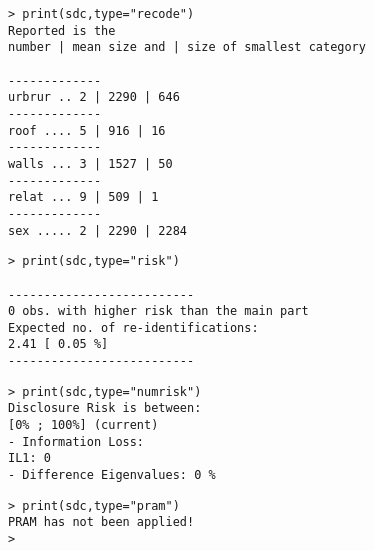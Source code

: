 \documentclass[SDCmaster.tex]{subfiles}
\begin{document}
\begin{frame}[fragile]
	\begin{verbatim}
> print(sdc,type="recode")
Reported is the
number | mean size and | size of smallest category

-------------
urbrur .. 2 | 2290 | 646 
-------------
roof .... 5 | 916 | 16 
-------------
walls ... 3 | 1527 | 50 
-------------
relat ... 9 | 509 | 1 
-------------
sex ..... 2 | 2290 | 2284 
\end{verbatim}
\end{frame}
\begin{frame}[fragile]
	\begin{verbatim}
> print(sdc,type="risk")

--------------------------
0 obs. with higher risk than the main part
Expected no. of re-identifications:
2.41 [ 0.05 %]
--------------------------

\end{verbatim}
\end{frame}
\begin{frame}[fragile]
	\begin{verbatim}
> print(sdc,type="numrisk")
Disclosure Risk is between: 
[0% ; 100%] (current)
- Information Loss:
IL1: 0
- Difference Eigenvalues: 0 %
\end{verbatim}
\end{frame}
\begin{frame}[fragile]
	\begin{verbatim}
> print(sdc,type="pram")
PRAM has not been applied!
> 
\end{verbatim}
\end{frame}
\end{document}
